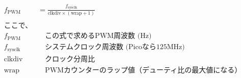 \begin{align*}
f_{\mathrm{PWM}} &= \frac{f_{\mathrm{sysclk}}}{\mathrm{clkdiv} \times (\mathrm{wrap} + 1)} \\
\\
\text{ここで、}& \\
f_{\mathrm{PWM}}   &\quad \text{この式で求めるPWM周波数 (Hz)} \\
f_{\mathrm{sysclk}} &\quad \text{システムクロック周波数 (Picoなら125MHz)} \\
\mathrm{clkdiv}  &\quad \text{クロック分周比} \\
\mathrm{wrap}    &\quad \text{PWMカウンターのラップ値（デューティ比の最大値になる）} \\
\end{align*}